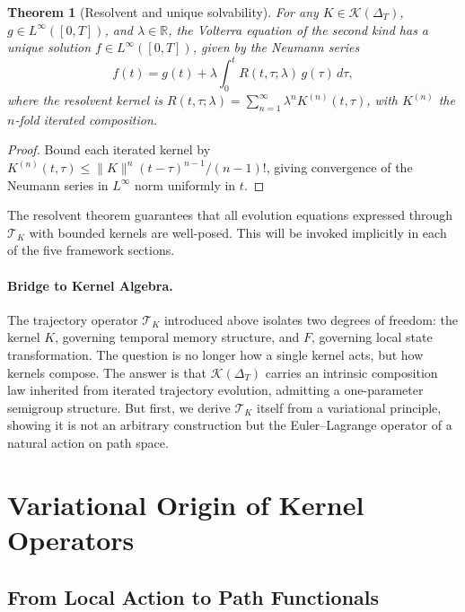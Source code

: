 \documentclass[12pt]{article}
\newtheorem{theorem}{Theorem}[section]
\newcommand{\R}{\mathbb{R}}
\newcommand{\Kcal}{\mathcal{K}}
\newcommand{\TK}{\mathcal{T}_K}
\begin{document}
\begin{theorem}[Resolvent and unique solvability]
\label{thm:resolvent}
For any $K \in \Kcal(\Delta_T)$, $g \in L^\infty([0,T])$, and $\lambda \in \R$,
the Volterra equation of the second kind has a unique solution
$f \in L^\infty([0,T])$, given by the Neumann series
\[
  f(t) = g(t) + \lambda \int_0^t R(t,\tau;\lambda)\, g(\tau)\, d\tau,
\]
where the resolvent kernel is $R(t,\tau;\lambda) = \sum_{n=1}^\infty
\lambda^n K^{(n)}(t,\tau)$, with $K^{(n)}$ the $n$-fold iterated composition.
\end{theorem}

\begin{proof}
Bound each iterated kernel by $K^{(n)}(t,\tau) \leq \|K\|^n (t-\tau)^{n-1}/(n-1)!$,
giving convergence of the Neumann series in $L^\infty$ norm uniformly in $t$.
\end{proof}

The resolvent theorem guarantees that all evolution equations expressed
through $\TK$ with bounded kernels are well-posed. This will be invoked
implicitly in each of the five framework sections.


\paragraph{Bridge to Kernel Algebra.}
The trajectory operator $\TK$ introduced above isolates two degrees of
freedom: the kernel $K$, governing temporal memory structure, and $F$,
governing local state transformation. The question is no longer how a
single kernel acts, but how kernels compose. The answer is that
$\Kcal(\Delta_T)$ carries an intrinsic composition law inherited from
iterated trajectory evolution, admitting a one-parameter semigroup
structure. But first, we derive $\TK$ itself from a variational principle,
showing it is not an arbitrary construction but the Euler--Lagrange operator
of a natural action on path space.

\section{Variational Origin of Kernel Operators}
\label{sec:variational}

\subsection{From Local Action to Path Functionals}
\end{document}
